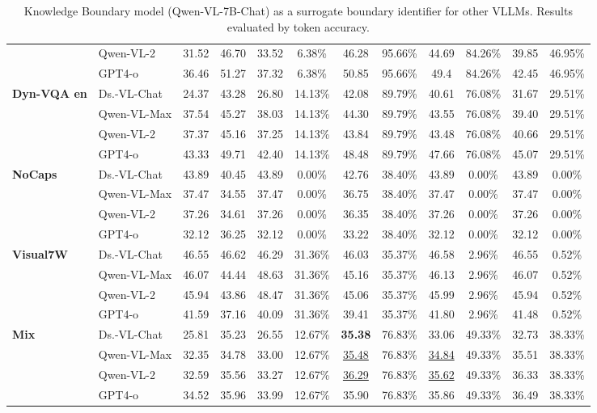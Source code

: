 \begin{table*}[t]
{\begin{tabular}{llcccccccc|cc}
 & Qwen-VL-2 & 31.52 & 46.70 & 33.52 & 6.38\% & 46.28 & 95.66\% & 44.69 & 84.26\% & 39.85 & 46.95\% \\
 & GPT4-o & 36.46 & 51.27 & 37.32 & 6.38\% & 50.85 & 95.66\% & 49.4 & 84.26\% & 42.45 & 46.95\% \\ 
\midrule
\multirow{4}{*}{\textbf{Dyn-VQA en}} & Ds.-VL-Chat & 24.37 & 43.28 & 26.80 & 14.13\% & 42.08 & 89.79\% & 40.61 & 76.08\% & 31.67 & 29.51\% \\
 & Qwen-VL-Max & 37.54 & 45.27 & 38.03 & 14.13\% & 44.30 & 89.79\% & 43.55 & 76.08\% & 39.40 & 29.51\% \\
 & Qwen-VL-2 & 37.37 & 45.16 & 37.25 & 14.13\% & 43.84 & 89.79\% & 43.48 & 76.08\% & 40.66 & 29.51\% \\
 & GPT4-o & 43.33 & 49.71 & 42.40 & 14.13\% & 48.48 & 89.79\% & 47.66 & 76.08\% & 45.07 & 29.51\% \\ 
\midrule
\multirow{4}{*}{\textbf{NoCaps}} & Ds.-VL-Chat & 43.89 & 40.45 & 43.89 & 0.00\% & 42.76 & 38.40\% & 43.89 & 0.00\% & 43.89 & 0.00\% \\
 & Qwen-VL-Max & 37.47 & 34.55 & 37.47 & 0.00\% & 36.75 & 38.40\% & 37.47 & 0.00\% & 37.47 & 0.00\% \\
 & Qwen-VL-2 & 37.26 & 34.61 & 37.26 & 0.00\% & 36.35 & 38.40\% & 37.26 & 0.00\% & 37.26 & 0.00\% \\
 & GPT4-o & 32.12 & 36.25 & 32.12 & 0.00\% & 33.22 & 38.40\% & 32.12 & 0.00\% & 32.12 & 0.00\% \\ 
\midrule
\multirow{4}{*}{\textbf{Visual7W}} & Ds.-VL-Chat & 46.55 & 46.62 & 46.29 & 31.36\% & 46.03 & 35.37\% & 46.58 & 2.96\% & 46.55 & 0.52\% \\
 & Qwen-VL-Max & 46.07 & 44.44 & 48.63 & 31.36\% & 45.16 & 35.37\% & 46.13 & 2.96\% & 46.07 & 0.52\% \\
 & Qwen-VL-2 & 45.94 & 43.86 & 48.47 & 31.36\% & 45.06 & 35.37\% & 45.99 & 2.96\% & 45.94 & 0.52\% \\
 & GPT4-o & 41.59 & 37.16 & 40.09 & 31.36\% & 39.41 & 35.37\% & 41.80 & 2.96\% & 41.48 & 0.52\% \\ 
\midrule
\midrule
\multirow{4}{*}{\textbf{Mix}} & Ds.-VL-Chat & 25.81 & 35.23 & 26.55 & 12.67\% & \textbf{35.38} & 76.83\% & 33.06 & 49.33\% & 32.73 & 38.33\% \\
 & Qwen-VL-Max & 32.35 & 34.78 & 33.00 & 12.67\% & \uline{35.48} & 76.83\% & \uline{34.84} & 49.33\% & 35.51 & 38.33\% \\
 & Qwen-VL-2 & 32.59 & 35.56 & 33.27 & 12.67\% & \uline{36.29} & 76.83\% & \uline{35.62} & 49.33\% & 36.33 & 38.33\% \\
 & GPT4-o & 34.52 & 35.96 & 33.99 & 12.67\% & 35.90 & 76.83\% & 35.86 & 49.33\% & 36.49 & 38.33\% \\
\bottomrule
\end{tabular}
}
\caption{Knowledge Boundary model (Qwen-VL-7B-Chat) as a surrogate boundary identifier for other VLLMs. Results evaluated by token accuracy.}
\label{main_results_acc_table}
\end{table*}


